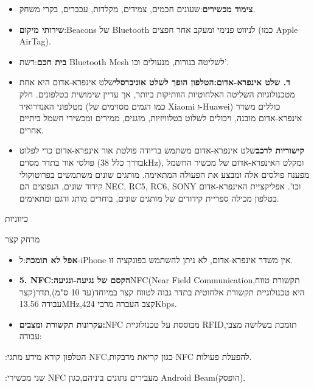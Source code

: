 \begin{itemize}
  \item \textbf{צימוד מכשירים}:שעונים חכמים, צמידים, מקלדות, עכברים, בקרי משחק.
  \item \textbf{שירותי מיקום}:Beacons של Bluetooth לניווט פנימי ומעקב אחר חפצים (כמו Apple AirTag).
  \item \textbf{בית חכם}:רשת Bluetooth Mesh לשליטה בנורות, מנעולים וכו'.
  \item \textbf{ד. שלט אינפרא-אדום:הטלפון הופך לשלט אוניברסלי}שלט אינפרא-אדום היא אחת מטכנולוגיות השליטה האלחוטיות הוותיקות ביותר, אך עדיין שימושית בטלפונים. חלק מטלפוני האנדרואיד (כמו דגמים מסוימים של Xiaomi ו-Huawei) כוללים משדר אינפרא-אדום מובנה, ויכולים לשלוט בטלוויזיות, מזגנים, ממירים ומכשירי חשמל ביתיים אחרים.
  \item \textbf{קישוריות לרכב}שלט אינפרא-אדום משתמש בדיודה פולטת אור אינפרא-אדום כדי לפלוט פולסי אור בתדר מסוים (בדרך כלל 38kHz), ומקלט האינפרא-אדום של מכשיר החשמל מפענח פולסים אלה ומבצע את הפעולה המתאימה. מותגים שונים משתמשים בפרוטוקולי קידוד שונים, הנפוצים הם NEC, RC5, RC6, SONY וכו'. אפליקציית האינפרא-אדום בטלפון מכילה ספריית קידודים של מותגים שונים, בוחרים מותג ודגם ומתאימים.
\end{itemize}


כיווניות


מרחק קצר


\begin{itemize}
  \item \textbf{אפל לא תומכת}:ל-iPhone אין משדר אינפרא-אדום, לא ניתן להשתמש בפונקציה זו.
  \item \textbf{5. NFC:הקסם של נגיעה-ונגיעה}NFC(Near Field Communication,תקשורת טווח קצר)היא טכנולוגיית תקשורת אלחוטית בתדר גבוה לטווח קצר במיוחד(עד 10 ס"מ),תדר עבודה 13.56MHz,קצב העברה מרבי 424Kbps.
  \item \textbf{עקרונות תקשורת ומצבים:}NFC מבוססת על טכנולוגיית RFID,תומכת בשלושה מצבי עבודה:
\end{itemize}


:הטלפון קורא מידע מתגי NFC,כגון קריאת מדבקות NFC להפעלת פעולות.


:שני מכשירי NFC מעבירים נתונים ביניהם,כגון Android Beam(הופסק).


